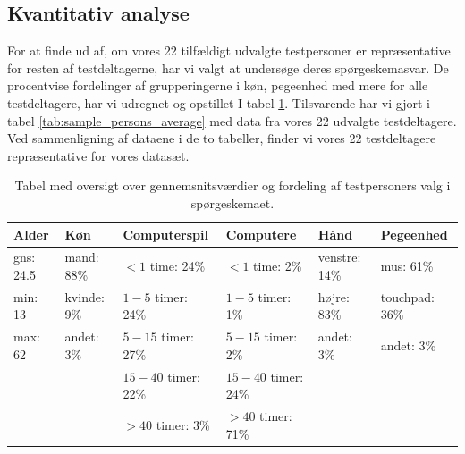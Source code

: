 \subsection*{Kvantitativ analyse}
For at finde ud af, om vores 22 tilfældigt udvalgte testpersoner er repræsentative for resten af testdeltagerne, har vi valgt at undersøge deres spørgeskemasvar. De procentvise fordelinger af grupperingerne i køn, pegeenhed med mere for alle testdeltagere, har vi udregnet og opstillet I tabel \ref{tab:persons_average}. Tilsvarende har vi gjort i tabel \ref{tab:sample_persons_average} med data fra vores 22 udvalgte testdeltagere. Ved sammenligning af dataene i de to tabeller, finder vi vores 22 testdeltagere repræsentative for vores datasæt.

\begin{table}[h]
	\centering
	\begin{tabular}{llllll}
		Alder           & Køn               & Computerspil              & Computere                 & Hånd                & Pegeenhed            \\\hline
		gns: \hfill24.5 & mand: \hfill88\%  & $<1$ time: \hfill24\%     & $<1$ time: \hfill2\%      & venstre: \hfill14\% & mus: \hfill61\%      \\
		min: \hfill13   & kvinde: \hfill9\% & $1-5$ timer: \hfill24\%   & $1-5$ timer: \hfill1\%    & højre: \hfill83\%   & touchpad: \hfill36\% \\
		max: \hfill62   & andet: \hfill3\%  & $5-15$ timer: \hfill27\%  & $5-15$ timer: \hfill2\%   & andet: \hfill3\%    & andet: \hfill3\%     \\
		                &                   & $15-40$ timer: \hfill22\% & $15-40$ timer: \hfill24\% &                     &\\
		                &                   & $>40$ timer: \hfill3\%    & $>40$ timer: \hfill71\%   &                     &
	\end{tabular}
	\caption{Tabel med oversigt over gennemsnitsværdier og fordeling af testpersoners valg i spørgeskemaet.}
	\label{tab:persons_average}
\end{table}


